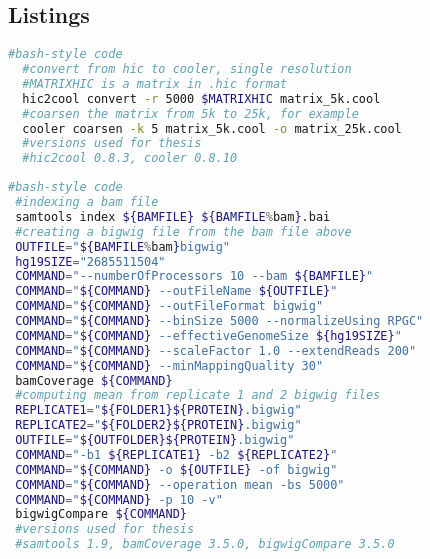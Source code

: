 \clearpage
\subsection{Listings}
\begin{lstlisting}[language=bash, caption=hic to cooler, label=list:methods:hic2cool]
  #bash-style code
  #convert from hic to cooler, single resolution
  #MATRIXHIC is a matrix in .hic format
  hic2cool convert -r 5000 $MATRIXHIC matrix_5k.cool
  #coarsen the matrix from 5k to 25k, for example
  cooler coarsen -k 5 matrix_5k.cool -o matrix_25k.cool
  #versions used for thesis
  #hic2cool 0.8.3, cooler 0.8.10
\end{lstlisting}


\begin{lstlisting}[language=bash, caption=bam to bigwig, label=list:methods:bamtobigwig]
 #bash-style code
 #indexing a bam file
 samtools index ${BAMFILE} ${BAMFILE%bam}.bai
 #creating a bigwig file from the bam file above
 OUTFILE="${BAMFILE%bam}bigwig"
 hg19SIZE="2685511504"
 COMMAND="--numberOfProcessors 10 --bam ${BAMFILE}" 
 COMMAND="${COMMAND} --outFileName ${OUTFILE}"
 COMMAND="${COMMAND} --outFileFormat bigwig" 
 COMMAND="${COMMAND} --binSize 5000 --normalizeUsing RPGC"
 COMMAND="${COMMAND} --effectiveGenomeSize ${hg19SIZE}"
 COMMAND="${COMMAND} --scaleFactor 1.0 --extendReads 200"
 COMMAND="${COMMAND} --minMappingQuality 30"
 bamCoverage ${COMMAND}
 #computing mean from replicate 1 and 2 bigwig files
 REPLICATE1="${FOLDER1}${PROTEIN}.bigwig"
 REPLICATE2="${FOLDER2}${PROTEIN}.bigwig"
 OUTFILE="${OUTFOLDER}${PROTEIN}.bigwig"
 COMMAND="-b1 ${REPLICATE1} -b2 ${REPLICATE2}"
 COMMAND="${COMMAND} -o ${OUTFILE} -of bigwig"
 COMMAND="${COMMAND} --operation mean -bs 5000"
 COMMAND="${COMMAND} -p 10 -v"
 bigwigCompare ${COMMAND}
 #versions used for thesis
 #samtools 1.9, bamCoverage 3.5.0, bigwigCompare 3.5.0
\end{lstlisting}


